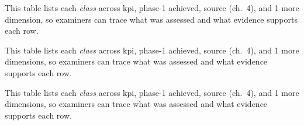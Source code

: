 \begin{table}[!htbp]

\centering\tablestripes\tablefontsize
{\small
{}

\noindent This table lists each \textit{class} across kpi, phase-1 achieved, source (ch.~4), and 1 more dimension, so examiners can trace what was assessed and what evidence supports each row.



\noindent This table lists each \textit{class} across kpi, phase-1 achieved, source (ch.~4), and 1 more dimensions, so examiners can trace what was assessed and what evidence supports each row.


\noindent This table lists each \textit{class} across kpi, phase-1 achieved, source (ch.~4), and 1 more dimensions, so examiners can trace what was assessed and what evidence supports each row.



}
\end{table}
